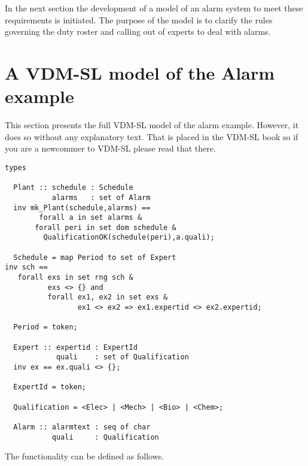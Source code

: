 In the next section the development of a model of an alarm
system to meet these requirements is initiated. The purpose of the model is to
clarify the rules governing the duty roster and calling out of experts
to deal with alarms.

\section{A VDM-SL model of the Alarm example}\label{sec:VDMModel}

This section presents the full VDM-SL model
of the alarm example. However, it does so without any explanatory
text. That is placed in the VDM-SL book so if you are a newcommer to
VDM-SL please read that there.

\begin{lstlisting}
types

  Plant :: schedule : Schedule
           alarms   : set of Alarm
  inv mk_Plant(schedule,alarms) ==
        forall a in set alarms &
	   forall peri in set dom schedule &
	     QualificationOK(schedule(peri),a.quali);
	     
  Schedule = map Period to set of Expert
inv sch ==
   forall exs in set rng sch &
          exs <> {} and
          forall ex1, ex2 in set exs &
                 ex1 <> ex2 => ex1.expertid <> ex2.expertid;

  Period = token;

  Expert :: expertid : ExpertId
            quali    : set of Qualification
  inv ex == ex.quali <> {};

  ExpertId = token;

  Qualification = <Elec> | <Mech> | <Bio> | <Chem>;
	   
  Alarm :: alarmtext : seq of char
           quali     : Qualification
\end{lstlisting}

The functionality can be defined as follows.

